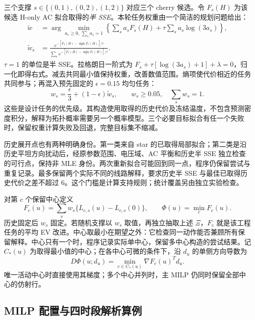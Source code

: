 \documentclass[UTF8,fontset=fandol,11pt,a4paper]{ctexart}
\begin{document}
三个支撑 $s\in\{(0,1),(0,2),(1,2)\}$ 对应三个 cherry 候选。令 $F_s(H)$ 为该候选 H-only AC 拟合取得的\emph{半 SSE}。本轮任务权重由一个简洁的规划问题给出：
\begin{align}
 \widetilde w&=\arg\min_{a_s\ge0,\,\sum_sa_s=1}
 \left\{\sum_sa_sF_s(H)+\tau\sum_sa_s\log(3a_s)\right\},\nonumber\\
 \widetilde w_s&=\frac{e^{-[F_s(H)-\min_rF_r(H)]/\tau}}
 {\sum_re^{-[F_r(H)-\min_rF_r(H)]/\tau}}.
 \label{si:entropy-tasks}
\end{align}
$\tau=1$ 的单位是半 SSE。拉格朗日一阶式为
$F_s+\tau[\log(3a_s)+1]+\lambda=0$，归一化即得右式。减去共同最小值保持权重，改善数值范围。熵项使代价相近的任务共同参与；再混入预先固定的 $\epsilon=0.15$ 均匀任务：
\begin{equation}
 w_s=\frac{\epsilon}{3}+(1-\epsilon)\widetilde w_s,\qquad
 w_s\ge0.05,\quad \sum_sw_s=1.
 \label{si:task-floor}
\end{equation}
这些是设计任务的优先级。其构造使用取得的历史代价及冻结温度，不包含预测密度积分，解释为拓扑概率需要另一个概率模型。三个必要目标拟合有任一个失败时，保留权重计算失败及回退，完整目标集不缩减。

历史展开点也有两种明确身份。第一类来自 star 的已取得局部拟合；第二类是沿历史平坦方向扰动后，经原参数范围、电压域、AC 平衡和历史半 SSE 独立检查的可行点，保持非 MLE 身份。两次重新拟合可能回到同一点，程序仍保留尝试与重复记录。最多保留两个实际不同的线路解释，要求历史半 SSE 与最佳已取得历史代价之差不超过 6。这个门槛是计算支持规则；统计覆盖另由独立实验检查。

对第 $c$ 个保留中心定义
\begin{equation}
 F_c(u)=\sum_sw_s\{L_{c,s}(u)-L_{c,s}(0)\},\qquad
 \boxed{\Phi(u)=\min_c F_c(u).}
 \label{si:robust-task}
\end{equation}
历史固定后 $w_s$ 固定。若随机支撑以 $w_s$ 取值，再独立抽取上述 $\Xi$，$F_c$ 就是该工程任务的平均 EV 改进。中心取最小在期望之外：它检查同一动作能否兼顾所有保留解释。中心只有一个时，程序记录实际单中心，保留多中心构造的尝试结果。记 $C_*(u)$ 为取得最小值的中心；在各中心可微的条件下，沿 $d_u$ 的单侧方向导数为
\begin{equation}
 D\Phi(u;d_u)=\min_{c\in C_*(u)}\nabla F_c(u)^Td_u.
 \label{si:active-centers}
\end{equation}
唯一活动中心时直接使用其梯度；多个中心并列时，主 MILP 仍同时保留全部中心的仿射行。

\subsection{MILP 配置与四时段解析算例}
\end{document}
